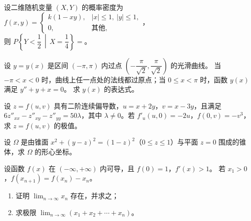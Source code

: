 \begin{question}[index=16]
设二维随机变量 $(X,Y)$ 的概率密度为 $f(x,y)=\begin{cases}
k(1-xy), & |x|\le 1,\ |y|\le 1,\\
0, & \text{其他},
\end{cases}$，\\
则 $P\!\left\{Y<\dfrac12\,\middle|\,X=\dfrac14\right\}=$\fillin。
\end{question}

\solveheading

\begin{question}[index=17,points=10,show-points=true,points-prelabel={（本题满分},points-postlabel={分）},points-separate-par=false]
设 $y=y(x)$ 是区间 $(-\pi,\pi)$ 内过点 $\left(-\dfrac{\pi}{\sqrt2},\dfrac{\pi}{\sqrt2}\right)$ 的光滑曲线。
当 $-\pi<x<0$ 时，曲线上任一点处的法线都过原点；当 $0\le x<\pi$ 时，函数 $y(x)$ 满足 $y''+y+x=0$。
求 $y(x)$ 的表达式。
\end{question}

\begin{question}[index=18,points=12,show-points=true,points-prelabel={（本题满分},points-postlabel={分）},points-separate-par=false]
设 $z=f(u,v)$ 具有二阶连续偏导数，$u=x+2y$，$v=x-3y$，且满足
$6z''_{xx}-z''_{xy}-z''_{yy}=50\lambda$，其中 $\lambda\ne 0$。若 $f'_u(u,0)=-2u$，$f(0,v)=-v^3$，求 $z=f(u,v)$ 的极值。
\end{question}

\begin{question}[index=19,points=12,show-points=true,points-prelabel={（本题满分},points-postlabel={分）},points-separate-par=false]
设 $\Omega$ 是由锥面 $x^2+(y-z)^2=(1-z)^2$（$0\le z\le 1$）与平面 $z=0$ 围成的锥体，求 $\Omega$ 的形心坐标。
\end{question}

\begin{question}[index=20,points=12,show-points=true,points-prelabel={（本题满分},points-postlabel={分）},points-separate-par=false]
设函数 $f(x)$ 在 $(-\infty,+\infty)$ 内可导，且 $f(0)=1$，$f'(x)>1$。
若 $x_1>0$，$f(x_{n+1})=f(x_n)-x_n$。
\begin{enumerate}[label=（\Roman*）,leftmargin=2.6em,labelsep=.4em,itemsep=3pt,topsep=3pt]
\item 证明 $\displaystyle\lim_{n\to\infty}x_n$ 存在，并求之；
\item 求极限 $\displaystyle\lim_{n\to\infty}(x_1+x_2+\cdots+x_n)$。
\end{enumerate}
\end{question}

